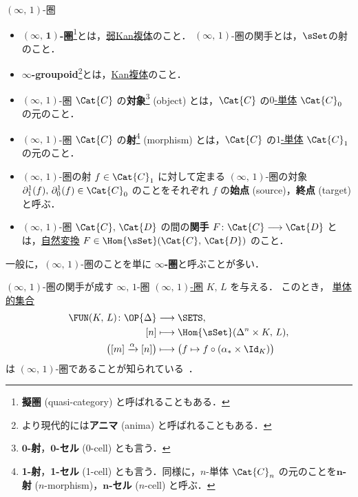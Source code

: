 \documentclass[TQFT_main]{subfiles}
\begin{document}
\begin{mydef}[label=def:infinity-1]{{$(\infty,\, 1)$}-圏}
    \begin{itemize}
        \item $\bm{(\infty,\, 1)}$\textbf{-圏}\footnote{\textbf{擬圏} (quasi-category) と呼ばれることもある．}とは，\hyperref[def:KanCplx]{弱Kan複体}のこと．
        $(\infty,\, 1)$-圏の関手とは，\hyperref[def:SimpSet]{$\sSet$}の射のこと．
        \item $\bm{\infty}$\textbf{-groupoid}\footnote{より現代的には\textbf{アニマ} (anima) と呼ばれることもある．}とは，\hyperref[def:KanCplx]{Kan複体}のこと．
    \end{itemize}
    \tcblower
    \begin{itemize}
        \item $(\infty,\, 1)$-圏 $\Cat{C}$ の\textbf{対象}\footnote{$\bm{0}$\textbf{-射}，$\bm{0}$\textbf{-セル} ($0$-cell) とも言う．} (object) とは，$\Cat{C}$ の\hyperref[def:SimpSet]{$0$-単体} $\Cat{C}_0$ の元のこと．
        \item $(\infty,\, 1)$-圏 $\Cat{C}$ の\textbf{射}\footnote{\textbf{1-射}，\textbf{1-セル} (1-cell) とも言う．同様に，$n$-単体 $\Cat{C}_n$ の元のことを\textbf{$\bm{n}$-射} ($n$-morphism)，\textbf{$\bm{n}$-セル} ($n$-cell) と呼ぶ．} (morphism) とは，$\Cat{C}$ の\hyperref[def:SimpSet]{$1$-単体} $\Cat{C}_1$ の元のこと．
        \item $(\infty,\, 1)$-圏の射 $f \in \Cat{C}_1$ に対して定まる $(\infty,\, 1)$-圏の対象 $\partial^1_1(f),\, \partial^1_0(f) \in \Cat{C}_0$ のことをそれぞれ $f$ の\textbf{始点} (source)，\textbf{終点} (target) と呼ぶ．
        \item $(\infty,\, 1)$-圏 $\Cat{C},\, \Cat{D}$ の間の\textbf{関手} $F \colon \Cat{C} \lto \Cat{D}$ とは，\hyperref[def:nat]{自然変換} $F \in \Hom{\sSet}(\Cat{C},\, \Cat{D})$ のこと．
    \end{itemize}
\end{mydef}

\begin{marker}
    一般に，$(\infty,\, 1)$-圏のことを単に $\bm{\infty}$\textbf{-圏}と呼ぶことが多い．
\end{marker}

\begin{myexample}[label=def:infty-Fun]{{$(\infty,\, 1)$}-圏の関手が成す {$\infty,\, 1$}-圏}
    \hyperref[def:infinity-1]{$(\infty,\, 1)$-圏} $K,\, L$ を与える．
    このとき，
    \hyperref[def:SimpSet]{単体的集合}
    \begin{align}
        \FUN (K,\, L) \colon \OP{\Delta} &\lto \SETS, \\
        [n] &\lmto \Hom{\sSet} (\Delta^n \times K,\, L), \\
        \bigl( [m] \xrightarrow{\alpha} [n] \bigr) &\lmto \bigl(f \mapsto f \circ (\alpha_* \times \Id_K)\bigr)
    \end{align}
    は $(\infty,\, 1)$-圏であることが知られている~\cite[\href{https://kerodon.net/tag/0066}{Tag 0066}]{kerodon}．
\end{myexample}
\end{document}
